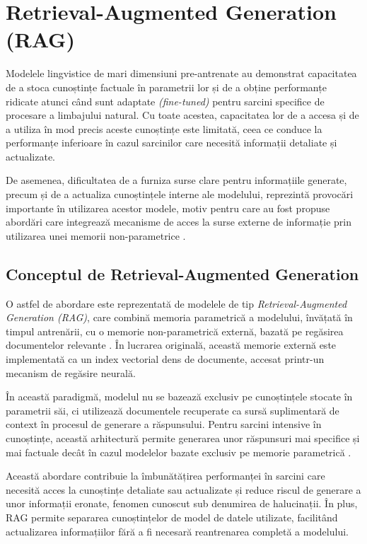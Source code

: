 \documentclass[12pt, a4paper, oneside, romanian]{teza-upb}
\begin{document}
\section{Retrieval-Augmented Generation (RAG)}

Modelele lingvistice de mari dimensiuni pre-antrenate au demonstrat capacitatea de a stoca cunoștințe factuale în parametrii lor și de a obține performanțe ridicate atunci când sunt adaptate \textit{(fine-tuned)} pentru sarcini specifice de procesare a limbajului natural. Cu toate acestea, capacitatea lor de a accesa și de a utiliza în mod precis aceste cunoștințe este limitată, ceea ce conduce la performanțe inferioare în cazul sarcinilor care necesită informații detaliate și actualizate.

De asemenea, dificultatea de a furniza surse clare pentru informațiile generate, precum și de a actualiza cunoștințele interne ale modelului, reprezintă provocări importante în utilizarea acestor modele, motiv pentru care au fost propuse abordări care integrează mecanisme de acces la surse externe de informație prin utilizarea unei memorii non-parametrice \cite{lewis2020retrieval}.



\subsection{Conceptul de Retrieval-Augmented Generation}

O astfel de abordare este reprezentată de modelele de tip \textit{Retrieval-Augmented Generation (RAG)}, care combină memoria parametrică a modelului, învățată în timpul antrenării, cu o memorie non-parametrică externă, bazată pe regăsirea documentelor relevante \cite{lewis2020retrieval}. În lucrarea originală, această memorie externă este implementată ca un index vectorial dens de documente, accesat printr-un mecanism de regăsire neurală.

În această paradigmă, modelul nu se bazează exclusiv pe cunoștințele stocate în parametrii săi, ci utilizează documentele recuperate ca sursă suplimentară de context în procesul de generare a răspunsului. Pentru sarcini intensive în cunoștințe, această arhitectură permite generarea unor răspunsuri mai specifice și mai factuale decât în cazul modelelor bazate exclusiv pe memorie parametrică \cite{lewis2020retrieval}.

Această abordare contribuie la îmbunătățirea performanței în sarcini care necesită acces la cunoștințe detaliate sau actualizate și reduce riscul de generare a unor informații eronate, fenomen cunoscut sub denumirea de halucinații. În plus, RAG permite separarea cunoștințelor de model de datele utilizate, facilitând actualizarea informațiilor fără a fi necesară reantrenarea completă a modelului.
\end{document}

